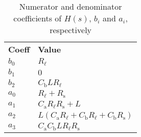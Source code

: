 \begin{table}[H]
\centering
\begin{tabular}[c]{ll}
\textbf{Coeff} & \textbf{Value} \\ 
\rowcolor{myyellow}
$b_{\mathrm{0}}$ &$R_{\ell}$ \\ 
$b_{\mathrm{1}}$ &$0$ \\ 
\rowcolor{myyellow}
$b_{\mathrm{2}}$ &$C_{\mathrm{b}} L R_{\ell}$ \\ 
$a_{\mathrm{0}}$ &$R_{\ell} + R_{\mathrm{s}}$ \\ 
\rowcolor{myyellow}
$a_{\mathrm{1}}$ &$C_{\mathrm{a}} R_{\ell} R_{\mathrm{s}} + L$ \\ 
$a_{\mathrm{2}}$ &$L \left(C_{\mathrm{a}} R_{\ell} + C_{\mathrm{b}} R_{\ell} + C_{\mathrm{b}} R_{\mathrm{s}}\right)$ \\ 
\rowcolor{myyellow}
$a_{\mathrm{3}}$ &$C_{\mathrm{a}} C_{\mathrm{b}} L R_{\ell} R_{\mathrm{s}}$ \\ 
\end{tabular}
\caption{Numerator and denominator coefficients of $H(s)$, $b_i$ and $a_i$, respectively}
\label{tab-coeffs}
\end{table}


